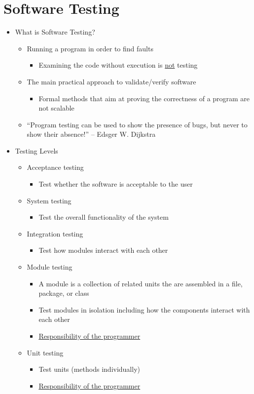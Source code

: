 \documentclass[11pt]{article}
\begin{document}
\section{Software Testing}
\begin{itemize}
	\item What is Software Testing?
		\begin{itemize}
			\item Running a program in order to find faults
				\begin{itemize}
					\item Examining the code without execution is \underline{not} testing
				\end{itemize}
			\item The main practical approach to validate/verify software
				\begin{itemize}
					\item Formal methods that aim at proving the correctness of a program are not
						scalable
				\end{itemize}
			\item “Program testing can be used to show the presence of bugs, but never to show their absence!” -- Edsger W. Dijkstra
		\end{itemize}
	\item Testing Levels
		\begin{itemize}
			\item Acceptance testing
				\begin{itemize}
					\item Test whether the software is acceptable to the user
				\end{itemize}
			\item System testing
				\begin{itemize}
					\item Test the overall functionality of the system
				\end{itemize}
			\item Integration testing
				\begin{itemize}
					\item Test how modules interact with each other
				\end{itemize}
			\item Module testing
				\begin{itemize}
					\item A module is a collection of related units the are assembled in a file, package, or class
					\item Test modules in isolation including how the components interact with each other
					\item \underline{Responsibility of the programmer}
				\end{itemize}
			\item Unit testing
				\begin{itemize}
					\item Test units (methods individually)
					\item \underline{Responsibility of the programmer}
				\end{itemize}
		\end{itemize}


\end{itemize}
\end{document}
